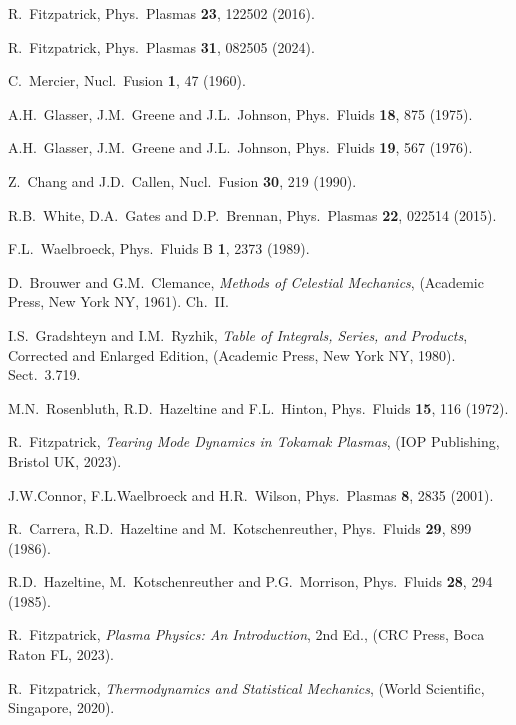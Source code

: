 \documentclass[12pt,prb,aps]{revtex4-1}
\begin{document}
\begin{thebibliography}{99}
 R.~Fitzpatrick, Phys.\ Plasmas {\bf 23}, 122502 (2016).

 R.~Fitzpatrick, Phys.\ Plasmas {\bf 31}, 082505 (2024).

 C.~Mercier, Nucl.\ Fusion {\bf 1}, 47 (1960).

 A.H.~Glasser, J.M.~Greene and J.L.~Johnson, Phys.\ Fluids {\bf 18}, 875 (1975).

 A.H.~Glasser, J.M.~Greene  and J.L.~Johnson, Phys.\ Fluids {\bf 19}, 567 (1976).

 Z.~Chang and J.D.~Callen,  Nucl.\ Fusion {\bf 30}, 219 (1990).

 R.B.~White, D.A.~Gates and D.P.~Brennan, Phys.\ Plasmas {\bf 22}, 022514 (2015). 

 F.L.~Waelbroeck, Phys.\ Fluids B {\bf 1}, 2373 (1989).

 D.~Brouwer and G.M.~Clemance, {\em Methods of Celestial Mechanics}, (Academic Press, New York NY, 1961).  Ch.~II.

 I.S.~Gradshteyn and I.M.~Ryzhik, {\em Table of Integrals, Series, and Products}, Corrected and Enlarged Edition, (Academic Press, New York NY, 1980). Sect.~3.719.

 M.N.~Rosenbluth, R.D.~Hazeltine and F.L.~Hinton, Phys.\ Fluids {\bf 15}, 116 (1972).

 R.~Fitzpatrick, {\em Tearing Mode Dynamics in Tokamak Plasmas}, (IOP Publishing, Bristol UK, 2023).

 J.W.Connor,  F.L.Waelbroeck and  H.R.~Wilson, Phys.\ Plasmas {\bf 8}, 2835 (2001). 

 R.~Carrera, R.D.~Hazeltine and M.~Kotschenreuther, Phys.\ Fluids {\bf 29}, 899 (1986). 

 R.D.~Hazeltine, M.~Kotschenreuther and P.G.~Morrison, Phys.\ Fluids {\bf 28}, 294 (1985). 

 R.~Fitzpatrick, {\em Plasma Physics: An Introduction}, 2nd Ed., (CRC Press, Boca Raton FL, 2023).

 R.~Fitzpatrick, {\em Thermodynamics and Statistical Mechanics}, (World Scientific, Singapore,  2020).

\end{thebibliography}
\end{document}
